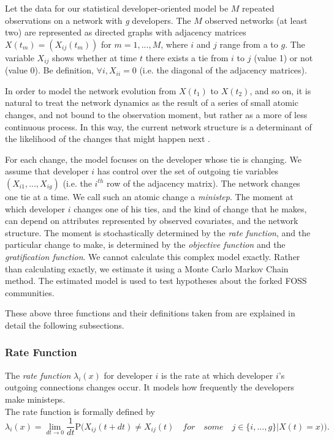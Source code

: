 \documentclass[12pt,letterpaper]{gthesis2}  %
\begin{document}
Let the data for our statistical developer-oriented model be $M$ repeated observations on a network with \textit{g} developers. The $M$ observed networks (at least two) are represented as directed graphs with adjacency matrices $X(t_m) = (X_{ij}(t_m))$ for $m = 1,...,M$, where $i$ and $j$ range from a to $g$. The variable $X_{ij}$ shows whether at time $t$ there exists a tie from $i$ to $j$ (value 1) or not (value 0). Be definition, $\forall i, X_{ii}=0$ (i.e. the diagonal of the adjacency matrices).

In order to model the network evolution from $X(t_1)$ to $X(t_2)$, and so on, it is natural to treat the network dynamics as the result of a series of small atomic changes, and not bound to the observation moment, but rather as a more of less continuous process. In this way, the current network structure is a determinant of the likelihood of the changes that might happen next \cite{Coleman1964}. 

For each change, the model focuses on the developer whose tie is changing. We assume that developer $i$ has control over the set of outgoing  tie variables $(X_{i1}, ..., X_{ig})$ (i.e. the $i^{th}$ row of the adjacency matrix). The network changes one tie at a time. We call such an atomic change a \textit{ministep}. The moment at which developer $i$ changes one of his ties, and the kind of change that he makes, can depend on attributes represented by observed covariates, and the network structure. The moment is stochastically determined by the \textit{rate function}, and the particular change to make, is determined by the \textit{objective function} and the \textit{gratification function}. We cannot calculate this complex model exactly. Rather than calculating exactly, we estimate it using a Monte Carlo Markov Chain method. The estimated model is used to test hypotheses about the forked FOSS communities. 

These above three functions and their definitions taken from \cite{Snijders2004} are explained in detail the following subsections.

\subsubsection*{Rate Function}

The \textit{rate function} $\lambda_i(x)$ for developer $i$ is the rate at which developer $i$'s outgoing connections changes occur. It models how frequently the developers make ministeps.\\
The rate function is formally defined \cite{Snijders2004} by
\begin{equation}
\lambda_i(x) = \lim_{dt \to 0} \frac{1}{dt} \mathrm {P} \big({X_{ij}(t + dt) \neq X_{ij}(t) \quad for \quad some \quad j \in \{i, ..., g\} | X(t) = x)}\big).
\end{equation}
\end{document}
